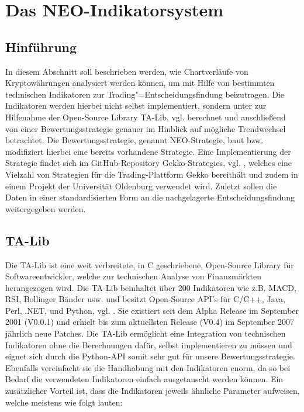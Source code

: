 		

\section{Das NEO-Indikatorsystem}

\subsection{Hinführung}

In diesem Abschnitt soll beschrieben werden, wie Chartverläufe von Kryptowährungen analysiert werden können, um mit Hilfe von bestimmten technischen Indikatoren zur Trading"=Entscheidungsfindung beizutragen. Die Indikatoren werden hierbei nicht selbst implementiert, sondern unter zur Hilfenahme der Open-Source Library TA-Lib, vgl. \cite{taLib} berechnet und anschließend von einer Bewertungsstrategie genauer im Hinblick auf mögliche Trendwechsel betrachtet. Die Bewertungsstrategie, genannt NEO-Strategie, baut bzw. modifiziert hierbei eine bereits vorhandene Strategie. Eine Implementierung der Strategie findet sich im GitHub-Repository Gekko-Strategies, vgl. \cite{gekko}, welches eine Vielzahl von Strategien für die Trading-Plattform Gekko bereithält und zudem in einem Projekt der Universität Oldenburg \cite{pro19} verwendet wird. Zuletzt sollen die Daten in einer standardisierten Form an die nachgelagerte Entscheidungsfindung weitergegeben werden.

\subsection{TA-Lib}

Die TA-Lib ist eine weit verbreitete, in C geschriebene, Open-Source Library für Softwareentwickler, welche zur technischen Analyse von Finanzmärkten herangezogen wird. Die TA-Lib beinhaltet über 200 Indikatoren wie z.B. MACD,  RSI, Bollinger Bänder usw. und besitzt Open-Source API’s für C/C++, Java, Perl, .NET, und Python, vgl. \cite{taLib}. Sie existiert seit dem Alpha Release im September 2001 (V0.0.1) und erhielt bis zum aktuellsten Release (V0.4) im September 2007 jährlich neue Patches. Die TA-Lib ermöglicht eine Integration von technischen Indikatoren ohne die Berechnungen dafür, selbst implementieren zu müssen und eignet sich durch die Python-API somit sehr gut für unsere Bewertungsstrategie. Ebenfalls vereinfacht sie die Handhabung mit den Indikatoren enorm, da so bei Bedarf die verwendeten Indikatoren einfach ausgetauscht werden können. Ein zusätzlicher Vorteil ist, dass die Indikatoren jeweils ähnliche Parameter aufweisen, welche meistens wie folgt lauten:\\

